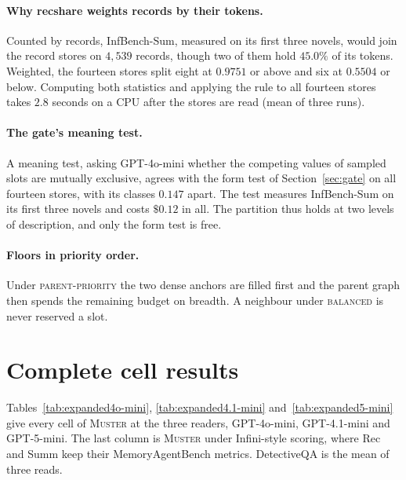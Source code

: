 \documentclass{article}
\newcommand{\sys}{\textsc{Muster}}
\newcommand{\cov}{\textsf{recshare}}
\newcommand{\balanced}{\textsc{balanced}}
\newcommand{\parprio}{\textsc{parent-priority}}
\begin{document}
\paragraph{Why \cov{} weights records by their tokens.} Counted by records, InfBench-Sum, measured on its first three novels, would join the record stores on $4{,}539$ records, though two of them hold $45.0\%$ of its tokens. Weighted, the fourteen stores split eight at $0.9751$ or above and six at $0.5504$ or below. Computing both statistics and applying the rule to all fourteen stores takes $2.8$ seconds on a CPU after the stores are read (mean of three runs).

\paragraph{The gate's meaning test.} A meaning test, asking GPT-4o-mini whether the competing values of sampled slots are mutually exclusive, agrees with the form test of Section~\ref{sec:gate} on all fourteen stores, with its classes $0.147$ apart. The test measures InfBench-Sum on its first three novels and costs $\$0.12$ in all. The partition thus holds at two levels of description, and only the form test is free.

\paragraph{Floors in priority order.} Under \parprio{} the two dense anchors are filled first and the parent graph then spends the remaining budget on breadth. A neighbour under \balanced{} is never reserved a slot.

\section{Complete cell results}\label{app:expanded}

Tables~\ref{tab:expanded4o-mini}, \ref{tab:expanded4.1-mini} and~\ref{tab:expanded5-mini} give every cell of \sys{} at the three readers, GPT-4o-mini, GPT-4.1-mini and GPT-5-mini. The last column is \sys{} under Infini-style scoring, where Rec and Summ keep their MemoryAgentBench metrics. DetectiveQA is the mean of three reads.
\end{document}
